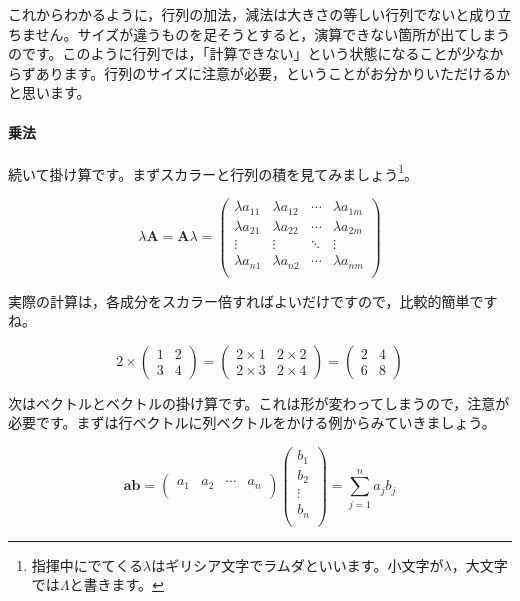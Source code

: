 \documentclass{ltjsbook}
\begin{document}
これからわかるように，行列の加法，減法は大きさの等しい行列でないと成り立ちません。サイズが違うものを足そうとすると，演算できない箇所が出てしまうのです。このように行列では，「計算できない」という状態になることが少なからずあります。行列のサイズに注意が必要，ということがお分かりいただけるかと思います。


\paragraph{乗法}
続いて掛け算です。まずスカラーと行列の積を見てみましょう\footnote{指揮中にでてくる$\lambda$はギリシア文字でラムダといいます。小文字が$\lambda$，大文字では$\Lambda$と書きます。}。

\begin{equation*}
    \lambda \bm{A} = \bm{A} \lambda =
    \begin{pmatrix}
        \lambda a_{11} & \lambda a_{12} & \cdots & \lambda a_{1m} \\
        \lambda a_{21} & \lambda a_{22} & \cdots & \lambda a_{2m} \\
        \vdots         & \vdots         & \ddots & \vdots         \\
        \lambda a_{n1} & \lambda a_{n2} & \cdots & \lambda a_{nm} \\
    \end{pmatrix}
\end{equation*}


実際の計算は，各成分をスカラー倍すればよいだけですので，比較的簡単ですね。

\begin{equation*}
    2 \times
    \begin{pmatrix}
        1 & 2 \\
        3 & 4
    \end{pmatrix}
    =
    \begin{pmatrix}
        2 \times 1 & 2 \times 2 \\
        2 \times 3 & 2 \times 4
    \end{pmatrix}
    =
    \begin{pmatrix}
        2 & 4 \\
        6 & 8
    \end{pmatrix}
\end{equation*}


次はベクトルとベクトルの掛け算です。これは形が変わってしまうので，注意が必要です。まずは行ベクトルに列ベクトルをかける例からみていきましょう。

\begin{equation*}
    \bm{a} \bm{b} =
    \begin{pmatrix}
        a_1 & a_2 & \cdots & a_n \\
    \end{pmatrix}
    \begin{pmatrix}
        b_1    \\
        b_2    \\
        \vdots \\
        b_n    \\
    \end{pmatrix}
    =
    \sum_{j=1}^{n} a_{j} b_{j}
\end{equation*}
\end{document}

